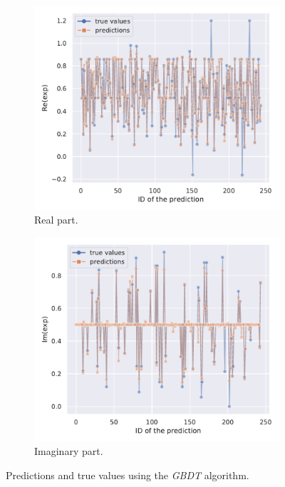 \begin{figure}[htbp]
  \centering
  \begin{subfigure}{0.45\textwidth}
    \centering
    \includegraphics[width=\linewidth]{img/gbdt_test_exp_re_plot}
    \caption{Real part.}
  \end{subfigure}
  \begin{subfigure}{0.45\textwidth}
    \centering
    \includegraphics[width=\linewidth]{img/gbdt_test_exp_im_plot}
    \caption{Imaginary part.}
  \end{subfigure}
  \caption{Predictions and true values using the \emph{GBDT} algorithm.}
  \label{fig:agg:gbdt_pred}
\end{figure}

